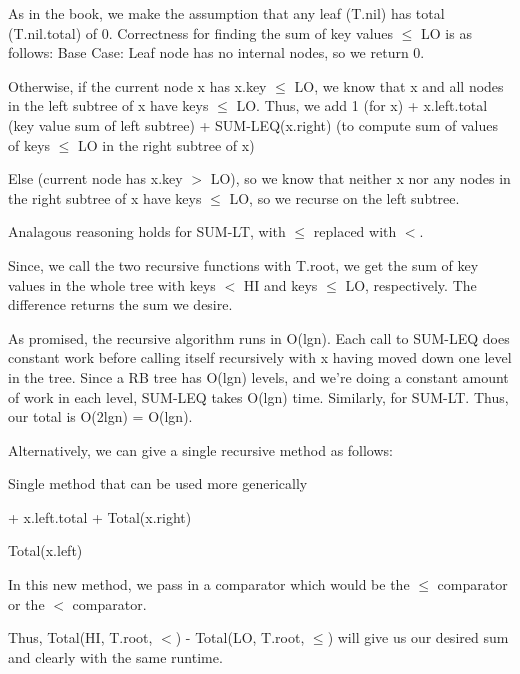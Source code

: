 \documentclass[11pt,a4paper]{article}
\begin{document}
As in the book, we make the assumption that any leaf (T.nil) has total (T.nil.total) of 0. Correctness for finding the sum of key values $\leq$ LO is as follows: \newline
Base Case: Leaf node has no internal nodes, so we return 0. \newline

Otherwise, if the current node x has x.key $\leq$ LO, we know that x and all nodes in the left subtree of x have keys $\leq$ LO. Thus, we add 1 (for x) + x.left.total (key value sum of left subtree) + SUM-LEQ(x.right) (to compute sum of values of keys $\leq$ LO in the right subtree of x)

Else (current node has x.key $>$ LO), so we know that neither x nor any nodes in the right subtree of x have keys $\leq$ LO, so we recurse on the left subtree.

Analagous reasoning holds for SUM-LT, with $\leq$ replaced with $<$. 

Since, we call the two recursive functions with T.root, we get the sum of key values in the whole tree with keys $<$ HI and keys $\leq$ LO, respectively. The difference returns the sum we desire.
\newline

As promised, the recursive algorithm runs in O(lgn). Each call to SUM-LEQ does constant work before calling itself recursively with x having moved down one level in the tree. Since a RB tree has O(lgn) levels, and we're doing a constant amount of work in each level, SUM-LEQ takes O(lgn) time. Similarly, for SUM-LT. Thus, our total is O(2lgn) = O(lgn).

Alternatively, we can give a single recursive method as follows:

\begin{algorithm}
\caption{Single method that can be used more generically}
\begin{algorithmic}
	\EndIf
		\State {} + x.left.total + Total(x.right)
	
	\Else
		\State \Return Total(x.left)
	\EndIf
	
\EndFunction
\end{algorithmic}
\end{algorithm}

In this new method, we pass in a comparator which would be the $\leq$ comparator or the $<$ comparator.

Thus, Total(HI, T.root, $<$) - Total(LO, T.root, $\leq$) will give us our desired sum and clearly with the same runtime. 
\end{document}
